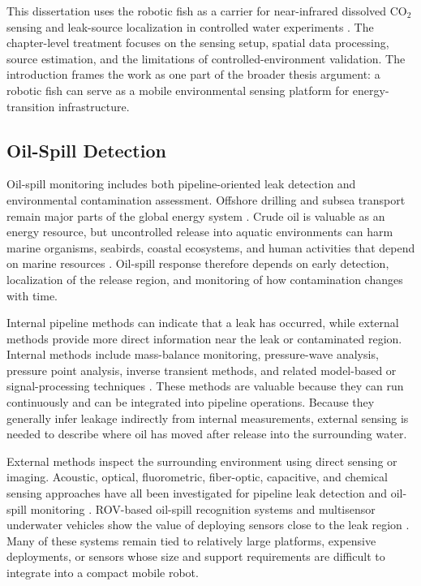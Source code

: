 \documentclass{uhcoethesis}
\begin{document}
This dissertation uses the robotic fish as a carrier for near-infrared dissolved \mbox{CO$_2$} sensing and leak-source localization in controlled water experiments \cite{Masood2025CO2}. The chapter-level treatment focuses on the sensing setup, spatial data processing, source estimation, and the limitations of controlled-environment validation. The introduction frames the work as one part of the broader thesis argument: a robotic fish can serve as a mobile environmental sensing platform for energy-transition infrastructure.

\subsection{Oil-Spill Detection}

Oil-spill monitoring includes both pipeline-oriented leak detection and environmental contamination assessment. Offshore drilling and subsea transport remain major parts of the global energy system \cite{HeinrichBoellStiftung2017}. Crude oil is valuable as an energy resource, but uncontrolled release into aquatic environments can harm marine organisms, seabirds, coastal ecosystems, and human activities that depend on marine resources \cite{Almeda2014,Albers1982}. Oil-spill response therefore depends on early detection, localization of the release region, and monitoring of how contamination changes with time.

Internal pipeline methods can indicate that a leak has occurred, while external methods provide more direct information near the leak or contaminated region. Internal methods include mass-balance monitoring, pressure-wave analysis, pressure point analysis, inverse transient methods, and related model-based or signal-processing techniques \cite{Martins2010,Hou2013,Akib2011,Vitkovsky2007,Ostapkowicz2016,Reda2024}. These methods are valuable because they can run continuously and can be integrated into pipeline operations. Because they generally infer leakage indirectly from internal measurements, external sensing is needed to describe where oil has moved after release into the surrounding water.

External methods inspect the surrounding environment using direct sensing or imaging. Acoustic, optical, fluorometric, fiber-optic, capacitive, and chemical sensing approaches have all been investigated for pipeline leak detection and oil-spill monitoring \cite{Jasper2012,Lukonge2020,Adegboye2019,Yao2024,Du2025}. ROV-based oil-spill recognition systems and multisensor underwater vehicles show the value of deploying sensors close to the leak region \cite{Qasem2019,Pocwiardowski2021}. Many of these systems remain tied to relatively large platforms, expensive deployments, or sensors whose size and support requirements are difficult to integrate into a compact mobile robot.
\end{document}
